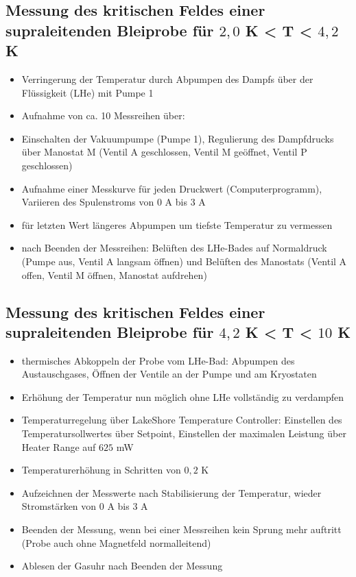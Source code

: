 \documentclass[german,  %
parskip=full,  %
]{scrartcl}
\begin{document}
\subsection{Messung des kritischen Feldes einer supraleitenden Bleiprobe für $2,0$ K < T < $4,2$ K}
\begin{itemize}
\item Verringerung der Temperatur durch Abpumpen des Dampfs über der Flüssigkeit (LHe) mit Pumpe 1
\item Aufnahme von ca. 10 Messreihen über:
\item Einschalten der Vakuumpumpe (Pumpe 1), Regulierung des Dampfdrucks über Manostat M (Ventil A geschlossen, Ventil M geöffnet, Ventil P geschlossen)
\item Aufnahme einer Messkurve für jeden Druckwert (Computerprogramm), Variieren des Spulenstroms von $0$ A bis $3$ A
\item für letzten Wert längeres Abpumpen um tiefste Temperatur zu vermessen
\item nach Beenden der Messreihen: Belüften des LHe-Bades auf Normaldruck (Pumpe aus, Ventil A langsam öffnen) und  Belüften des Manostats (Ventil A offen, Ventil M öffnen, Manostat aufdrehen)
\end{itemize}

\subsection{Messung des kritischen Feldes einer supraleitenden Bleiprobe für $4,2$ K < T < $10$ K}
\begin{itemize} 
\item thermisches Abkoppeln der Probe vom LHe-Bad: Abpumpen des Austauschgases, Öffnen der Ventile an der Pumpe und am Kryostaten
\item Erhöhung der Temperatur nun möglich ohne LHe vollständig zu verdampfen
\item Temperaturregelung über LakeShore Temperature Controller: Einstellen des Temperatursollwertes über Setpoint, Einstellen der maximalen Leistung über Heater Range auf $625$ mW
\item Temperaturerhöhung in Schritten von $0,2$ K
\item Aufzeichnen der Messwerte nach Stabilisierung der Temperatur, wieder Stromstärken von $0$ A bis $3$ A
\item Beenden der Messung, wenn bei einer Messreihen kein Sprung mehr auftritt (Probe auch ohne Magnetfeld normalleitend)
\item Ablesen der Gasuhr nach Beenden der Messung
\end{itemize}
\end{document}

